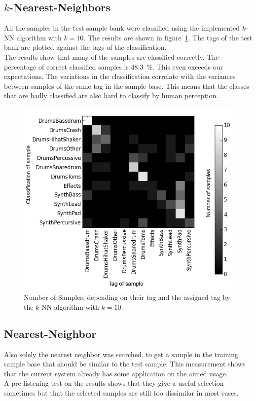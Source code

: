 \subsection{$k$-Nearest-Neighbors}
All the samples in the test sample bank were classified using the implemented $k$-NN algorithm with $k=10$. The results are shown in figure~\ref{fig:k-NN}. The tags of the test bank are plotted against the tags of the classification.\\
The results show that many of the samples are classified correctly. The percentage of correct classified samples is 48.3~\%. This even exceeds our expectations. The variations in the classification correlate with the variances between samples of the same tag in the sample base. This means that the classes that are badly classified are also hard to classify by human perception.

\begin{figure}[htbp]
\centering
\includegraphics[width=0.47\linewidth]{../measurements/knn_mod.png}
\caption{Number of Samples, depending on their tag and the assigned tag by the $k$-NN algorithm with $k=10$.}
\label{fig:k-NN}
\end{figure}

\subsection{Nearest-Neighbor}
Also solely the nearest neighbor was searched, to get a sample in the training sample base that should be similar to the test sample. This measurement shows that the current system already has some application on the aimed usage.\\
A pre-listening test on the results shows that they give a useful selection sometimes but that the selected samples are still too dissimilar in most cases.


